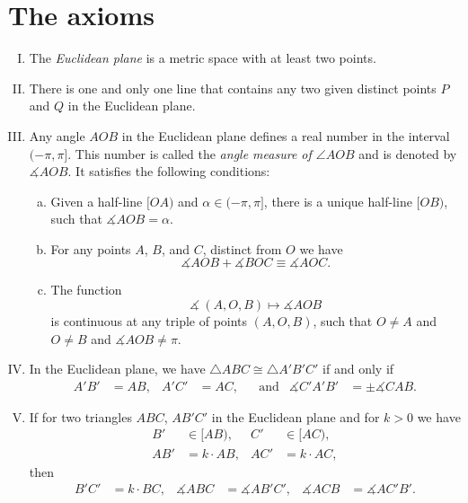 \newpage

\section{The axioms}
\label{sec:axioms}


\begin{framed}
\begin{enumerate}[I.]
\item\label{def:birkhoff-axioms:0} The \emph{Euclidean plane} is a metric space with at least two points.


\item\label{def:birkhoff-axioms:1} 
There is one and only one line that contains any two given distinct points $P$ and $Q$ in the Euclidean plane.

\item\label{def:birkhoff-axioms:2} 
Any angle $AOB$ in the Euclidean plane 
defines a real number in the interval $(-\pi,\pi]$.
This number is called the \emph{angle measure of $\angle AOB$}
and is denoted by $\measuredangle A O B$.
It satisfies the following conditions:
\begin{enumerate}[(a)]
\item\label{def:birkhoff-axioms:2a} 
Given a half-line $[O A)$ and $\alpha\in(-\pi,\pi]$, 
there is a unique  half-line $[O B)$, 
such that $\measuredangle A O B= \alpha$.
\item\label{def:birkhoff-axioms:2b} 
For any points $A$, $B$, and $C$, distinct from $O$ we have
$$\measuredangle A O B+\measuredangle B O C
\equiv\measuredangle A O C.$$
\item\label{def:birkhoff-axioms:2c} 
The function 
$$\measuredangle\:(A,O,B)\mapsto\measuredangle A O B$$
is continuous at any triple of points $(A,O,B)$,
such that $O\ne A$ and $O\ne B$ and $\measuredangle A O B\ne\pi$.

\end{enumerate}

\item\label{def:birkhoff-axioms:3}  
In the Euclidean plane, we have
$\triangle A B C\cong\triangle A' B' C'$
if and only if 
\begin{align*}
A' B'&=A B, & A' C'&= A C, &&\text{and}
&\measuredangle C' A' B'&=\pm\measuredangle C A B.
\end{align*}
\item\label{def:birkhoff-axioms:4}
If for two triangles $ABC$, $AB'C'$ in the Euclidean plane
and for $k>0$ we have
\begin{align*}
B'&\in [AB),
& C'&\in [AC),
\\
AB'&=k\cdot AB,&
AC'&=k\cdot AC,
\end{align*}
then
\begin{align*}
B'C'&=k\cdot BC,&
\measuredangle ABC&=\measuredangle AB'C',
&
\measuredangle ACB&=\measuredangle AC'B'.
\end{align*}
\end{enumerate}
\end{framed}

